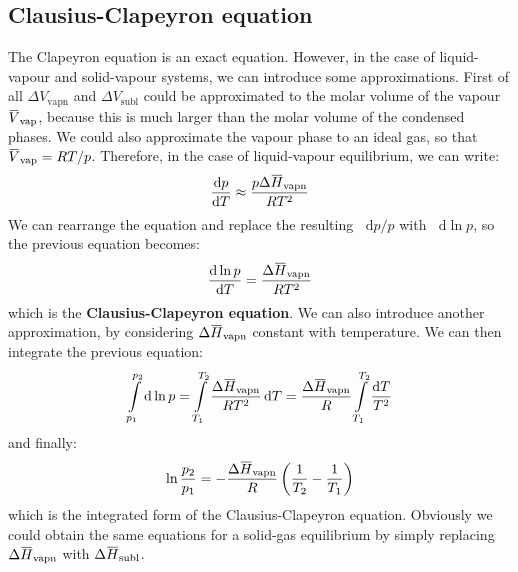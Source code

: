 \documentclass[12pt,a4paper]{report}
\newcommand*\diff{\mathop{}\!\mathrm{d}}
\newcommand{\overbar}[1]{\mkern 1.5mu\overline{\mkern-1.5mu#1\mkern-1.5mu}\mkern 1.5mu}
\begin{document}
   \subsection*{Clausius-Clapeyron equation}
   The Clapeyron equation is an exact equation. However, in the case of liquid-vapour and solid-vapour systems, we can introduce some approximations. First of all $\Delta V_{\mathrm{vapn}}$ and  $\Delta V_{\mathrm{subl}}$ could be approximated to the molar volume of the vapour $\overbar{V}_{\mathrm{vap}}$, because this is much larger than the molar volume of the condensed phases. We could also approximate the vapour phase to an ideal gas, so that $\overbar{V}_{\mathrm{vap}} = RT/p$. Therefore, in the case of liquid-vapour equilibrium, we can write:
   \begin{equation*}
   \frac{\diff p}{\diff T} \approx \frac{p \Delta \overbar{H}_{\mathrm{vapn}}}{RT^{2} }
   \end{equation*}
   We can rearrange the equation and replace the resulting $\diff p/p$ with $\diff \ln p$, so the previous equation becomes:
      \begin{equation*}
   \frac{\diff \ln p}{\diff T} = \frac{\Delta \overbar{H}_{\mathrm{vapn}}}{RT^{2} }
   \end{equation*}
   which is the \textbf{Clausius-Clapeyron equation}.
   We can also introduce another approximation, by considering $\Delta \overbar{H}_{\mathrm{vapn}}$ constant with temperature. We can then integrate the previous equation:
   \begin{equation*}
   \int \limits_{p_{1}}^{p_{2}} \diff \ln p = \int \limits_{T_{1}}^{T_{2}} \frac{\Delta \overbar{H}_{\mathrm{vapn}}}{RT^{2} } \diff T = \frac{\Delta \overbar{H}_{\mathrm{vapn}}}{R}\int \limits_{T_{1}}^{T_{2}} \frac{\diff T}{T^{2}}
   \end{equation*}
   and finally:
   \begin{equation*}
   \ln \frac{p_{2}}{p_{1}}=-\frac{\Delta \overbar{H}_{\mathrm{vapn}}}{R} \left(\frac{1}{T_{2}}-\frac{1}{T_{1}}\right)
   \end{equation*}   
   which is the integrated form of the Clausius-Clapeyron equation. Obviously we could obtain the same equations for a solid-gas equilibrium by simply replacing $\Delta \overbar{H}_{\mathrm{vapn}}$ with $\Delta \overbar{H}_{\mathrm{subl}}$.
\end{document}
